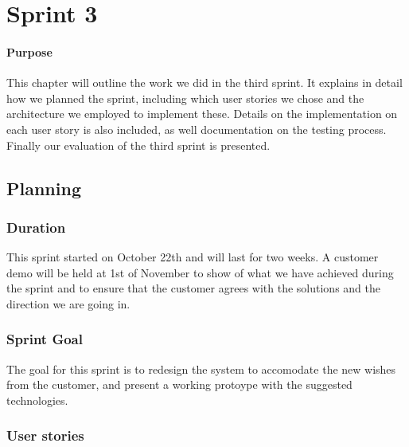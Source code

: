 \chapter{Sprint 3}

\minitoc

\subsubsection{Purpose}

This chapter will outline the work we did in the third sprint. It explains in detail how we planned the sprint, including which user stories we chose and the architecture we employed to implement these. Details on the implementation on each user story is also included, as well documentation on the testing process. Finally our evaluation of the third sprint is presented. 

\clearpage

\section{Planning}

\subsection{Duration}
This sprint started on October 22th and will last for two weeks. A customer demo will be held at 1st of November to show of what we have achieved during the sprint and to ensure that the customer agrees with the solutions and the direction we are going in.

\subsection{Sprint Goal}
The goal for this sprint is to redesign the system to accomodate the new wishes from the customer, and present a working protoype with the suggested technologies.

\subsection{User stories}


